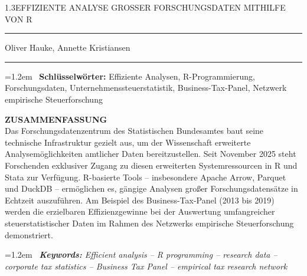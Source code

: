 \documentclass[
  german,
  10pt,
  twoside]{article}
\begin{document}
\begin{titlepage}
\begin{minipage}[t]{11.8cm}
{\LARGE\color{wistaDarkGray}\begin{spacing}{1.3}\MakeUppercase{Effiziente Analyse großer Forschungsdaten mithilfe von R}\end{spacing}}

\vspace{-0.2cm}

{\color{wistaBlue}\rule{\linewidth}{0.5pt}}

\vspace{0.5cm}

{\large\color{wistaDarkGray} Oliver Hauke, Annette Kristiansen}

\vspace{0.05cm}

{\color{wistaBlue}\rule{\linewidth}{0.5pt}}

\vspace{0.5cm}

\hangindent=1.2em
{\color{wistaBlue}\ {\bfseries Schlüsselwörter:} Effiziente Analysen, R-Programmierung, Forschungsdaten, Unternehmenssteuerstatistik, Business-Tax-Panel, Netzwerk empirische Steuerforschung}

\vspace{0.3cm}

{\color{wistaDarkGray}\bfseries\MakeUppercase{Zusammenfassung}}\\[0.15cm]
\small
Das Forschungsdatenzentrum des Statistischen Bundesamtes baut seine technische Infrastruktur gezielt aus, um der Wissenschaft erweiterte Analysemöglichkeiten amtlicher Daten bereitzustellen. Seit November 2025 steht Forschenden exklusiver Zugang zu diesen erweiterten Systemressourcen in R und Stata zur Verfügung. R-basierte Tools -- insbesondere Apache Arrow, Parquet und DuckDB -- ermöglichen es, gängige Analysen großer Forschungsdatensätze in Echtzeit auszuführen. Am Beispiel des Business-Tax-Panel (2013 bis 2019) werden die erzielbaren Effizienzgewinne bei der Auswertung umfangreicher steuerstatistischer Daten im Rahmen des Netzwerks empirische Steuerforschung demonstriert.

\vspace{0.5cm}

\hangindent=1.2em
{\itshape\color{wistaBlue}\ {\bfseries Keywords:} Efficient analysis -- R programming -- research data -- corporate tax statistics -- Business Tax Panel -- empirical tax research network}


\end{minipage}
\end{titlepage}
\end{document}
